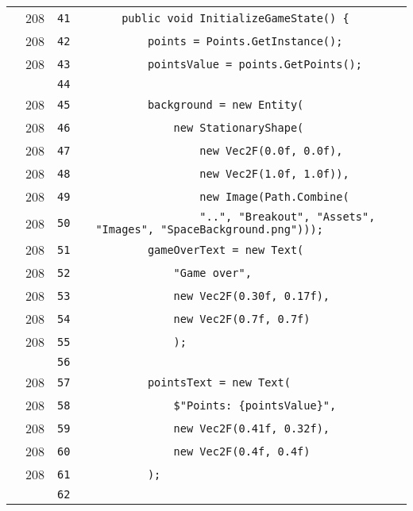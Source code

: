 \documentclass[a4paper,landscape,10pt]{article}
\begin{document}
\begin{longtable}[l]{lrrll}
\cellcolor{green} & 208 & \verb~41~ & & \verb~    public void InitializeGameState() {~\\
\cellcolor{green} & 208 & \verb~42~ & & \verb~        points = Points.GetInstance();~\\
\cellcolor{green} & 208 & \verb~43~ & & \verb~        pointsValue = points.GetPoints();~\\
\cellcolor{gray} &  & \verb~44~ & & \verb~~\\
\cellcolor{green} & 208 & \verb~45~ & & \verb~        background = new Entity(~\\
\cellcolor{green} & 208 & \verb~46~ & & \verb~            new StationaryShape(~\\
\cellcolor{green} & 208 & \verb~47~ & & \verb~                new Vec2F(0.0f, 0.0f),~\\
\cellcolor{green} & 208 & \verb~48~ & & \verb~                new Vec2F(1.0f, 1.0f)),~\\
\cellcolor{green} & 208 & \verb~49~ & & \verb~                new Image(Path.Combine(~\\
\cellcolor{green} & 208 & \verb~50~ & & \verb~                "..", "Breakout", "Assets", "Images", "SpaceBackground.png")));~\\
\cellcolor{green} & 208 & \verb~51~ & & \verb~        gameOverText = new Text(~\\
\cellcolor{green} & 208 & \verb~52~ & & \verb~            "Game over",~\\
\cellcolor{green} & 208 & \verb~53~ & & \verb~            new Vec2F(0.30f, 0.17f),~\\
\cellcolor{green} & 208 & \verb~54~ & & \verb~            new Vec2F(0.7f, 0.7f)~\\
\cellcolor{green} & 208 & \verb~55~ & & \verb~            );~\\
\cellcolor{gray} &  & \verb~56~ & & \verb~~\\
\cellcolor{green} & 208 & \verb~57~ & & \verb~        pointsText = new Text(~\\
\cellcolor{green} & 208 & \verb~58~ & & \verb~            $"Points: {pointsValue}",~\\
\cellcolor{green} & 208 & \verb~59~ & & \verb~            new Vec2F(0.41f, 0.32f),~\\
\cellcolor{green} & 208 & \verb~60~ & & \verb~            new Vec2F(0.4f, 0.4f)~\\
\cellcolor{green} & 208 & \verb~61~ & & \verb~        );~\\
\cellcolor{gray} &  & \verb~62~ & & \verb~~\\

\end{longtable}
\end{document}
